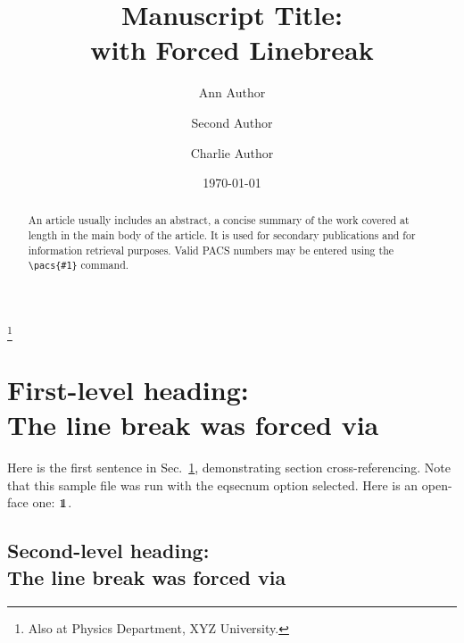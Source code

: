 \documentclass[prb]{revtex4}
\makeatletter
\def\btt#1{\texttt{\@backslashchar#1}}%
\DeclareRobustCommand\bblash{\btt{\@backslashchar}}%
\makeatother
\begin{document}

\title[Short Title]{Manuscript Title:\\
with Forced Linebreak}%

\author{Ann  Author}
 \thanks{Also at Physics Department, XYZ University.}%
\author{Second Author}%
%

\author{Charlie Author}
\address{
Second institution and/or address\\
This line break forced%
}%

\date{\today}%

\begin{abstract}
An article usually includes an abstract,
a concise summary of the work covered at length in the main body of the article.
It is used for secondary publications and for information retrieval purposes.
Valid PACS numbers may be entered using the \verb+\pacs{#1}+ command.
\end{abstract}

%

\maketitle

\tableofcontents

\section{First-level heading:\protect\\ The line break was forced via \bblash}
\label{sec:level1}

Here is the first sentence in Sec.~\ref{sec:level1}, demonstrating
section cross-referencing. Note that this sample file was run
with the eqsecnum option selected.
Here is an open-face one: $\openone$.

\subsection{Second-level heading:\protect\\ The line break was forced via \bblash}
\label{sec:level2}
\end{document}
